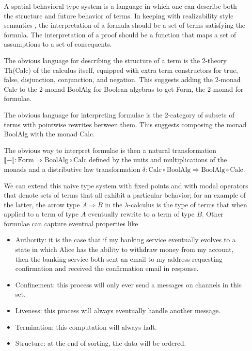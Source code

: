 \documentclass{llncs}
\newcommand{\interp}[1]{\llbracket #1 \rrbracket}
\newcommand{\maps}{\colon}
\renewcommand{\:}{\colon}
\newcommand{\Calc}{\mathrm{Calc}}
\newcommand{\BoolAlg}{\mathrm{BoolAlg}}
\renewcommand{\Form}{\mathrm{Form}}
\begin{document}
  A spatial-behavioral type system is a language in which one can describe both the structure and future behavior of terms.  In keeping with realizability style semantics  \cite{Krivine-TheCurryHowardCorre}, the interpretation of a formula should be a set of terms satisfying the formula.  The interpretation of a proof should be a function that maps a set of assumptions to a set of consequents.

  The obvious language for describing the structure of a term is the 2-theory Th(Calc) of the calculus itself, equipped with extra term constructors for true, false, disjunction, conjunction, and negation.  This suggests adding the 2-monad Calc to the 2-monad BoolAlg for Boolean algebras to get Form, the 2-monad for formulae.

  The obvious language for interpreting formulae is the 2-category of subsets of terms with pointwise rewrites between them.  This suggests composing the monad BoolAlg with the monad Calc.

  The obvious way to interpret formulae is then a natural transformation $\interp{-} \maps \Form \Rightarrow \BoolAlg \circ \Calc$ defined by the units and multiplications of the monads and a distributive law transformation $\delta\maps \Calc \circ \BoolAlg \Rightarrow \BoolAlg \circ \Calc.$

  We can extend this naive type system with fixed points and with modal operators that denote sets of terms that all exhibit a particular behavior; for an example of the latter, the arrow type $A \Rightarrow B$ in the $\lambda$-calculus is the type of terms that when applied to a term of type $A$ eventually rewrite to a term of type $B$.  Other formulae can capture eventual properties like
\begin{itemize}
  \item Authority: it is the case that if my banking service eventually evolves to a state in which Alice has the ability to withdraw money from my account, then the banking service both sent an email to my address requesting confirmation and received the confirmation email in response.
  \item Confinement: this process will only ever send a messages on channels in this set.
  \item Liveness: this process will always eventually handle another message.
  \item Termination: this computation will always halt.
  \item Structure: at the end of sorting, the data will be ordered.
\end{itemize}
\end{document}

